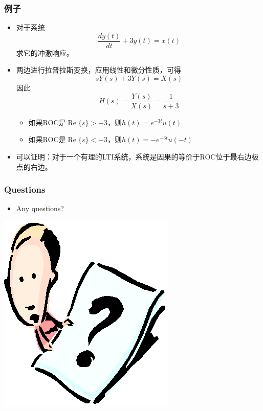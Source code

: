 \documentclass[CJKutf8,dvipsnames,table]{beamer}
\newif\ifxetexorluatex %
\begin{document}
\begin{CJK*}{UTF8}{song}
  \begin{frame}
    \frametitle{例子}
    \begin{itemize}
    \item 对于系统
    \[
    	\frac{dy(t)}{dt} + 3y(t) = x(t)
    \]
    求它的冲激响应。
    \item 两边进行拉普拉斯变换，应用线性和微分性质，可得
    \[
    	sY(s) + 3Y(s) = X(s)
    \]
    因此
    \[
    	H(s) = \frac{Y(s)}{X(s)} = \frac{1}{s+3}    
    \]
    	\begin{itemize}
		\item 如果ROC是$\operatorname{Re}\{s\} > -3$，则$h(t) = e^{-3t}u(t)$
		\item 如果ROC是$\operatorname{Re}\{s\} < -3$，则$h(t) = -e^{-3t}u(-t)$	
		\end{itemize}
		
	\item 可以证明：对于一个有理的LTI系统，系统是因果的等价于ROC位于最右边极点的右边。
    \end{itemize}
  \end{frame}
    
            
  \begin{frame}
    \frametitle{Questions}
    \begin{itemize}
    \item Any questions?
    \end{itemize}
    \begin{center}
      \includegraphics[scale=.5]{question}
    \end{center}
  \end{frame}    
  
\ifxetexorluatex\else
\end{CJK*}  
\fi  
\end{document}
